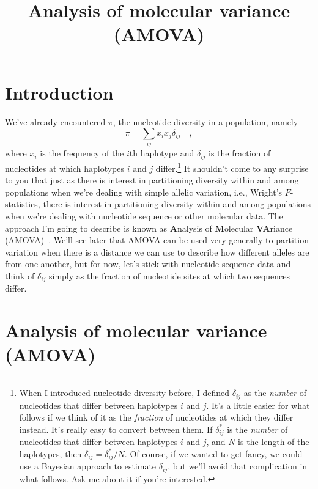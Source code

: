 \documentclass[12pt]{article}
\title{Analysis of molecular variance (AMOVA)}
\begin{document}
\maketitle

\thispagestyle{first}

\section*{Introduction}

We've already encountered $\pi$, the nucleotide diversity in a
population, namely
\[
\pi = \sum_{ij} x_ix_j \delta_{ij} \quad ,
\]
where $x_i$ is the frequency of the $i$th haplotype and $\delta_{ij}$
is the fraction of nucleotides at which haplotypes $i$ and $j$
differ.\footnote{When I introduced nucleotide diversity before, I
  defined $\delta_{ij}$ as the {\it number\/} of nucleotides that
  differ between haplotypes $i$ and $j$. It's a little easier for what
  follows if we think of it as the {\it fraction\/} of nucleotides at
  which they differ instead. It's really easy to convert between
  them. If $\delta^*_{ij}$ is the {\it number\/} of nucleotides that
  differ between haplotypes $i$ and $j$, and $N$ is the length of the
  haplotypes, then $\delta_{ij} = \delta^*_{ij}/N$. Of course, if we
  wanted to get fancy, we could use a Bayesian approach to estimate
  $\delta_{ij}$, but we'll avoid that complication in what
  follows. Ask me about it if you're interested.} It shouldn't come to
any surprise to you that just as there is interest in partitioning
diversity within and among populations when we're dealing with simple
allelic variation, i.e., Wright's $F$-statistics, there is interest in
partitioning diversity within and among populations when we're dealing
with nucleotide sequence or other molecular data. The approach I'm
going to describe is known as {\bf A}nalysis of {\bf M}olecular {\bf
  VA}riance (AMOVA)~\cite{Excoffier-etal92}. We'll see later that
AMOVA can be used very generally to partition variation when there is
a distance we can use to describe how different alleles are from one
another, but for now, let's stick with nucleotide sequence data and
think of $\delta_{ij}$ simply as the fraction of nucleotide sites at
which two sequences differ.

\section*{Analysis of molecular variance
  (AMOVA)}
\end{document}
